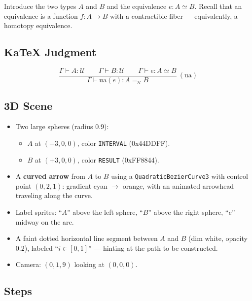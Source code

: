\documentclass[11pt,a4paper]{article}
\begin{document}
Introduce the two types $A$ and $B$ and the equivalence $e : A \simeq B$.
Recall that an equivalence is a function $f : A \to B$ with a contractible
fiber — equivalently, a homotopy equivalence.

\subsection{KaTeX Judgment}

\[
  \frac{
    \Gamma \vdash A : \mathcal{U}
    \qquad
    \Gamma \vdash B : \mathcal{U}
    \qquad
    \Gamma \vdash e : A \simeq B
  }{
    \Gamma \vdash \mathrm{ua}(e) : A =_{\mathcal{U}} B
  }\ (\text{ua})
\]

\subsection{3D Scene}

\begin{itemize}
  \item Two large spheres (radius 0.9):
    \begin{itemize}
      \item $A$ at $(-3, 0, 0)$, color \textcolor{colorInterval}{\texttt{INTERVAL}} (0x44DDFF).
      \item $B$ at $(+3, 0, 0)$, color \textcolor{colorResult}{\texttt{RESULT}} (0xFF8844).
    \end{itemize}
  \item A \textbf{curved arrow} from $A$ to $B$ using a
    \texttt{QuadraticBezierCurve3} with control point $(0, 2, 1)$:
    gradient \textcolor{colorInterval}{cyan} $\to$ \textcolor{colorResult}{orange},
    with an animated arrowhead traveling along the curve.
  \item Label sprites: ``$A$'' above the left sphere, ``$B$'' above the right
    sphere, ``$e$'' midway on the arc.
  \item A faint dotted horizontal line segment between $A$ and $B$
    (dim white, opacity 0.2), labeled ``$i \in [0,1]$'' — hinting at the path
    to be constructed.
  \item Camera: $(0, 1, 9)$ looking at $(0, 0, 0)$.
\end{itemize}

\subsection{Steps}
\end{document}
